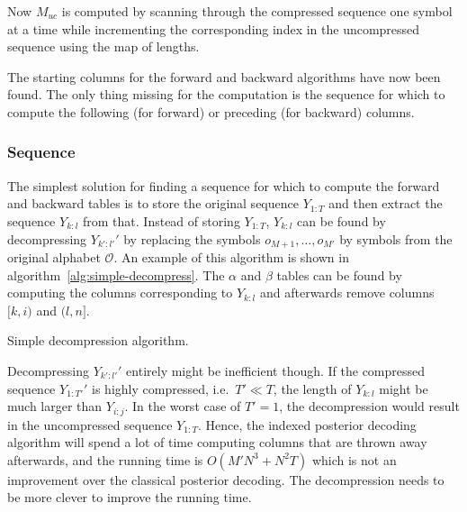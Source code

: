 Now $M_{uc}$ is computed by scanning through the
compressed sequence one symbol at a time while incrementing the corresponding
index in the uncompressed sequence using the map of lengths.

The starting columns for the forward and backward algorithms have now been
found. The only thing missing for the computation is the sequence for which to
compute the following (for forward) or preceding (for backward) columns.

\subsubsection{Sequence}

The simplest solution for finding a sequence for which to compute the forward
and backward tables is to store the original sequence $Y_{1:T}$ and then
extract the sequence $Y_{k:l}$ from that. Instead of storing $Y_{1:T}$,
$Y_{k:l}$ can be found by decompressing $Y_{k':l'}'$ by
replacing the symbols $o_{M + 1}, \dots, o_{M'}$ by symbols from the original
alphabet $\mathcal{O}$. An example of this algorithm is shown in
algorithm~\ref{alg:simple-decompress}. The $\alpha$ and $\beta$ tables can be
found by computing the columns corresponding to $Y_{k:l}$ and afterwards remove
columns $[k, i)$ and $(l, n]$.

\begin{algorithm}
  \caption{Simple decompression algorithm.}
  \label{alg:simple-decompress}
  \begin{algorithmic}[1]
        \EndFor{}
    \EndProcedure{}
  \end{algorithmic}
\end{algorithm}

Decompressing $Y_{k':l'}'$ entirely might be inefficient though. If the
compressed sequence $Y_{1:T'}'$ is highly compressed, i.e.\ $T' \ll T$, the
length of $Y_{k:l}$ might be much larger than $Y_{i:j}$. In the worst case of
$T' = 1$, the decompression would result in the uncompressed sequence
$Y_{1:T}$. Hence, the indexed posterior decoding algorithm will spend a lot of
time computing columns that are thrown away afterwards, and the running time is
$O(M' N^3 + N^2 T)$ which is not an improvement over the classical
posterior decoding. The decompression needs to be more clever to improve the
running time.

